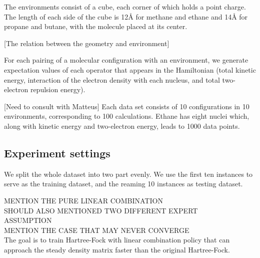\documentclass[twoside]{article}
\begin{document}

The environments consist of a cube, each corner of which holds a point charge. The length of each side of the cube is 12Å for methane and ethane and 14Å for propane and butane, with the molecule placed at its center. 

[The relation between the geometry and environment]



For each pairing of a molecular configuration with an environment, we generate expectation values of each operator that appears in the Hamiltonian (total kinetic energy, interaction of the electron density with each nucleus, and total two-electron repulsion energy).

[Need to consult with Matteus]
Each data set consists of 10 configurations in 10 environments, corresponding to 100 calculations. Ethane has eight nuclei which, along with kinetic energy and two-electron energy, leads to 1000 data points. 




\subsection{Experiment settings}



We split the whole dataset into two part evenly. 
We use the first ten instances to serve as the training dataset, and the reaming 10 instances as testing dataset.

MENTION THE PURE LINEAR COMBINATION\\
SHOULD ALSO MENTIONED TWO DIFFERENT EXPERT \\
ASSUMPTION \\
MENTION THE CASE THAT MAY NEVER CONVERGE \\
The goal is to train Hartree-Fock with linear combination policy that can  approach the steady density matrix faster than the original Hartree-Fock.
\end{document}
